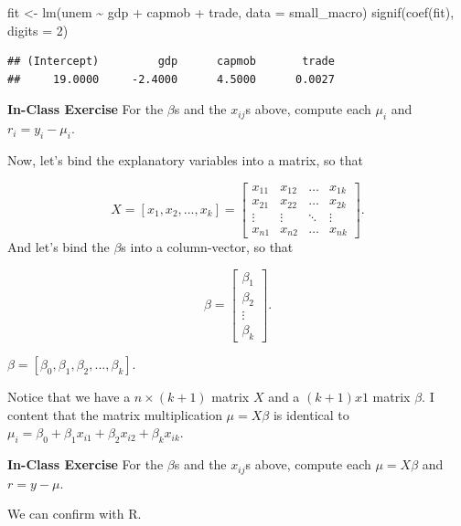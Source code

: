 \documentclass[
]{book}
\newenvironment{Shaded}{\begin{snugshade}}{\end{snugshade}}
\newcommand{\AttributeTok}[1]{\textcolor[rgb]{0.77,0.63,0.00}{#1}}
\newcommand{\DecValTok}[1]{\textcolor[rgb]{0.00,0.00,0.81}{#1}}
\newcommand{\FunctionTok}[1]{\textcolor[rgb]{0.00,0.00,0.00}{#1}}
\newcommand{\NormalTok}[1]{#1}
\newcommand{\OtherTok}[1]{\textcolor[rgb]{0.56,0.35,0.01}{#1}}
\newcommand{\SpecialCharTok}[1]{\textcolor[rgb]{0.00,0.00,0.00}{#1}}
\begin{document}
\begin{Shaded}
\begin{Highlighting}[]
\NormalTok{fit }\OtherTok{\textless{}{-}} \FunctionTok{lm}\NormalTok{(unem }\SpecialCharTok{\textasciitilde{}}\NormalTok{ gdp }\SpecialCharTok{+}\NormalTok{ capmob }\SpecialCharTok{+}\NormalTok{ trade, }\AttributeTok{data =}\NormalTok{ small\_macro)}
\FunctionTok{signif}\NormalTok{(}\FunctionTok{coef}\NormalTok{(fit), }\AttributeTok{digits =} \DecValTok{2}\NormalTok{)}
\end{Highlighting}
\end{Shaded}

\begin{verbatim}
## (Intercept)         gdp      capmob       trade 
##     19.0000     -2.4000      4.5000      0.0027
\end{verbatim}

\textbf{In-Class Exercise} For the \(\beta\)s and the \(x_{ij}\)s above, compute each \(\mu_i\) and \(r_i = y_i - \mu_i\).

Now, let's bind the explanatory variables into a matrix, so that

\[
X = [x_1, x_2, ..., x_k] = \begin{bmatrix} 
    x_{11} & x_{12} &\dots  & x_{1k}\\
    x_{21} & x_{22} &\dots  & x_{2k}\\
    \vdots & \vdots &\ddots & \vdots\\
    x_{n1} & x_{n2} & \dots  & x_{nk} 
    \end{bmatrix}.
\]
And let's bind the \(\beta\)s into a column-vector, so that

\[
\beta = \begin{bmatrix} 
    \beta_{1} \\
    \beta_{2} \\
    \vdots\\
    \beta_{k}  
    \end{bmatrix}.
\]

\(\beta = [\beta_0, \beta_1, \beta_2, ..., \beta_k]\).

Notice that we have a \(n \times (k + 1)\) matrix \(X\) and a \((k + 1) x 1\) matrix \(\beta\). I content that the matrix multiplication \(\mu = X\beta\) is identical to \(\mu_i = \beta_0 + \beta_1 x_{i1} + \beta_2 x_{i2} + \beta_k x_{ik}\).

\textbf{In-Class Exercise} For the \(\beta\)s and the \(x_{ij}\)s above, compute each \(\mu = X\beta\) and \(r = y - \mu\).

We can confirm with R.
\end{document}
